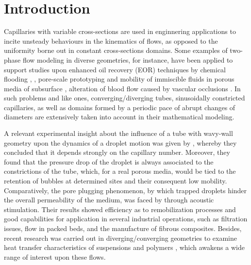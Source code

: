 \documentclass[12pt,fleqn]{article}
\begin{document}
\section{Introduction}

Capillaries with variable cross-sections are used in enginnering
applications to incite unsteady behaviours in the kinematics of flows, as
opposed to the uniformity borne out in constant cross-sections
domains. Some examples of two-phase flow modeling in diverse geometries,
for instance, have been applied to support studies upon enhanced oil
recovery (EOR) techniques by chemical flooding \cite{Olbricht1996}, \cite{Cobos2009}, pore-scale prototyping and mobility of immiscible fluids in porous media of subsurface \cite{Hemmat1996}, alteration of blood flow caused by
vascular occlusions \cite{Forsester1970}. In such problems and like ones, converging/diverging tubes, sinusoidally constricted capillaries, as
well as domains formed by a periodic pace of abrupt changes of diameters
are extensively taken into account in their mathematical modeling.

A relevant experimental insight about the influence of a tube with
wavy-wall geometry upon the dynamics of a droplet motion was given by
\cite{OlbrichtAndLeal1983}, whereby they concluded that it depends
strongly on the capillary number. Moreover, they found that the pressure
drop of the droplet is always associated to the constrictions of the
tube, which, for a real porous media, would be tied to the retention of
bubbles at determined sites and their consequent low mobility.
Comparatively, the pore plugging phenomenon, by which trapped droplets
hinder the overall permeability of the medium, was faced by \cite{Graham2000} 
through acoustic stimulation. Their results showed efficiency as to
remobilization processes and good capabilities for application in several
industrial operations, such as filtration issues, flow in packed beds,
and the manufacture of fibrous composites. Besides, recent research was
carried out in diverging/converging geometries to examine heat transfer
characteristics of suspensions and polymers \cite{Narayanam2014}, which
awakens a wide range of interest upon these flows.
\end{document}
